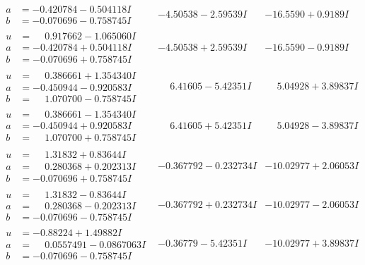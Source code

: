 \documentclass[1p]{elsarticle_modified}
\theoremstyle{definition}
\begin{document}
$$\begin{array}{c|c|c}
\begin{aligned}
a &= -0.420784 - 0.504118 I \\
b &= -0.070696 - 0.758745 I\end{aligned}
 & -4.50538 - 2.59539 I & -16.5590 + 0.9189 I \\ \hline\begin{aligned}
u &= \phantom{-}0.917662 - 1.065060 I \\
a &= -0.420784 + 0.504118 I \\
b &= -0.070696 + 0.758745 I\end{aligned}
 & -4.50538 + 2.59539 I & -16.5590 - 0.9189 I \\ \hline\begin{aligned}
u &= \phantom{-}0.386661 + 1.354340 I \\
a &= -0.450944 - 0.920583 I \\
b &= \phantom{-}1.070700 - 0.758745 I\end{aligned}
 & \phantom{-}6.41605 - 5.42351 I & \phantom{-}5.04928 + 3.89837 I \\ \hline\begin{aligned}
u &= \phantom{-}0.386661 - 1.354340 I \\
a &= -0.450944 + 0.920583 I \\
b &= \phantom{-}1.070700 + 0.758745 I\end{aligned}
 & \phantom{-}6.41605 + 5.42351 I & \phantom{-}5.04928 - 3.89837 I \\ \hline\begin{aligned}
u &= \phantom{-}1.31832 + 0.83644 I \\
a &= \phantom{-}0.280368 + 0.202313 I \\
b &= -0.070696 + 0.758745 I\end{aligned}
 & -0.367792 - 0.232734 I & -10.02977 + 2.06053 I \\ \hline\begin{aligned}
u &= \phantom{-}1.31832 - 0.83644 I \\
a &= \phantom{-}0.280368 - 0.202313 I \\
b &= -0.070696 - 0.758745 I\end{aligned}
 & -0.367792 + 0.232734 I & -10.02977 - 2.06053 I \\ \hline\begin{aligned}
u &= -0.88224 + 1.49882 I \\
a &= \phantom{-}0.0557491 - 0.0867063 I \\
b &= -0.070696 - 0.758745 I\end{aligned}
 & -0.36779 - 5.42351 I & -10.02977 + 3.89837 I \\ \hline\begin{aligned}

\end{aligned}
\end{array}$$
\end{document}
